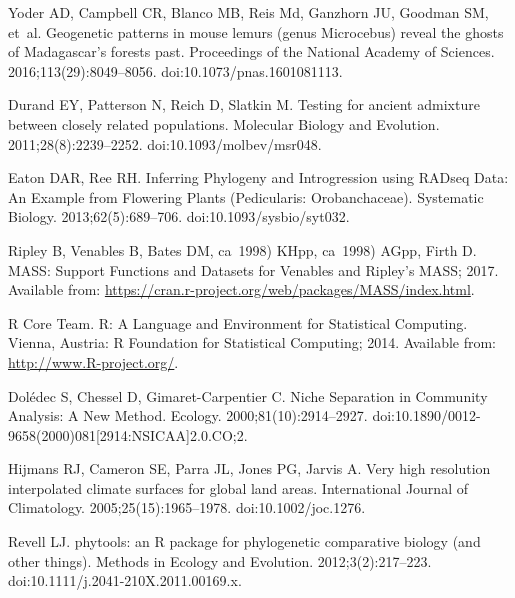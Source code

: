 \documentclass[10pt,letterpaper]{article}
\begin{document}
\begin{thebibliography}{10}
  Yoder AD, Campbell CR, Blanco MB, Reis Md, Ganzhorn JU, Goodman SM, et~al.
  \newblock Geogenetic patterns in mouse lemurs (genus {Microcebus}) reveal the
  ghosts of {Madagascar}'s forests past.
  \newblock Proceedings of the National Academy of Sciences.
  2016;113(29):8049--8056.
  \newblock doi:{10.1073/pnas.1601081113}.
  
  Durand EY, Patterson N, Reich D, Slatkin M.
  \newblock Testing for ancient admixture between closely related populations.
  \newblock Molecular Biology and Evolution. 2011;28(8):2239--2252.
  \newblock doi:{10.1093/molbev/msr048}.
  
  Eaton DAR, Ree RH.
  \newblock Inferring {Phylogeny} and {Introgression} using {RADseq} {Data}: {An} {Example} from {Flowering} {Plants} ({Pedicularis}: {Orobanchaceae}).
  \newblock Systematic Biology. 2013;62(5):689--706.
  \newblock doi:{10.1093/sysbio/syt032}.
  
  Ripley B, Venables B, Bates DM, ca~1998) KHpp, ca~1998) AGpp, Firth D. {MASS}:
  {Support} {Functions} and {Datasets} for {Venables} and {Ripley}'s {MASS};
  2017.
  \newblock Available from: \url{https://cran.r-project.org/web/packages/MASS/index.html}.
  

  {R Core Team}.
  \newblock R: {A} {Language} and {Environment} for {Statistical} {Computing}.
  \newblock Vienna, Austria: R Foundation for Statistical Computing; 2014.
  \newblock Available from: \url{http://www.R-project.org/}.
  

  Dolédec S, Chessel D, Gimaret-Carpentier C.
  \newblock Niche {Separation} in {Community} {Analysis}: {A} {New} {Method}.
  \newblock Ecology. 2000;81(10):2914--2927.
  \newblock doi:{10.1890/0012-9658(2000)081[2914:NSICAA]2.0.CO;2}.
  

  Hijmans RJ, Cameron SE, Parra JL, Jones PG, Jarvis A.
  \newblock Very high resolution interpolated climate surfaces for global land areas.
  \newblock International Journal of Climatology. 2005;25(15):1965--1978.
  \newblock doi:{10.1002/joc.1276}.
  
  Revell LJ.
  \newblock phytools: an {R} package for phylogenetic comparative biology (and
  other things).
  \newblock Methods in Ecology and Evolution. 2012;3(2):217--223.
  \newblock doi:{10.1111/j.2041-210X.2011.00169.x}.
  


\end{thebibliography}
\end{document}
